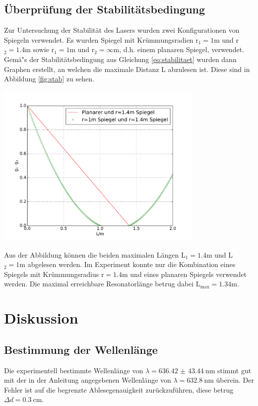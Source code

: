 \documentclass[captions=tableheading]{scrartcl}
\begin{document}
\subsection{Überprüfung der Stabilitätsbedingung}
Zur Untersuchung der Stabilität des Lasers wurden zwei Konfigurationen von Spiegeln verwendet. Es wurden Spiegel mit Krümmungsradien r$_1=1\si{\meter}$ und r$_2=1.4\si{\meter}$ sowie r$_1=1\si{\meter}$ und r$_2=\infty\si{\meter}$, d.h. einem planaren Spiegel, verwendet. \\
Gemä"s der Stabilitätsbedingung aus Gleichung \ref{eq:stabilitaet} wurden dann Graphen erstellt, an welchen die maximale Distanz L abzulesen ist. Diese sind in Abbildung \ref{fig:stab} zu sehen. \\
\begin{center}
	\includegraphics[width=10cm]{images/vorbereitung.pdf}
	\label{fig:stab}
\end{center}
Aus der Abbildung können die beiden maximalen Längen L$_1=1.4\si{\meter}$ und L$_2=1\si{\metre}$ abgelesen werden. Im Experiment konnte nur die Kombination eines Spiegels mit Krümmungsradius r$=1.4\si{\metre}$ und eines planaren Spiegels verwendet werden. Die maximal erreichbare Resonatorlänge betrug dabei L$_{\text{max}}=1.34\si{\meter}$.

\section{Diskussion}

\subsection{Bestimmung der Wellenlänge}
Die experimentell bestimmte Wellenlänge von $\lambda = \SI{636.42(4344)}{\nano\metre}$ stimmt gut mit der in der Anleitung angegebenen Wellenlänge von $\lambda = \SI{632.8}{\nano\metre}$ überein. Der Fehler ist auf die begrenzte Ablesegenauigkeit zurückzuführen, diese betrug $\Delta d=\SI{0.3}{\centi\metre}$.
\end{document}
